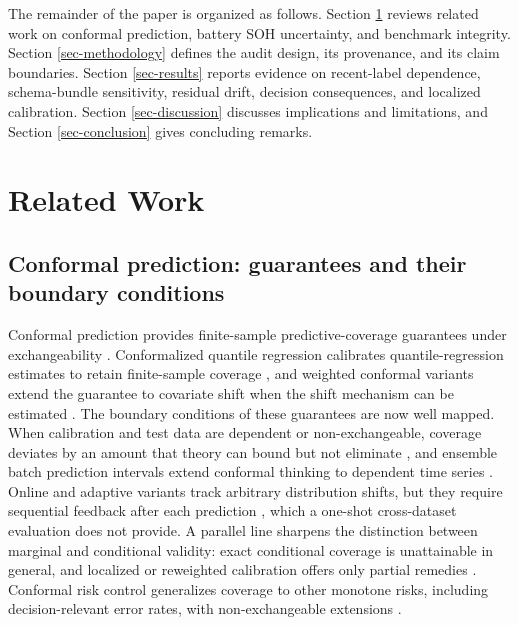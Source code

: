 \documentclass[
  number,
  preprint]{elsarticle}
\begin{document}
The remainder of the paper is organized as follows. Section
\ref{sec-related-work} reviews related work on conformal prediction,
battery SOH uncertainty, and benchmark integrity. Section
\ref{sec-methodology} defines the audit design, its provenance, and its
claim boundaries. Section \ref{sec-results} reports evidence on
recent-label dependence, schema-bundle sensitivity, residual drift,
decision consequences, and localized calibration. Section
\ref{sec-discussion} discusses implications and limitations, and Section
\ref{sec-conclusion} gives concluding remarks.

\section{Related Work}\label{sec-related-work}

\subsection{Conformal prediction: guarantees and their boundary
conditions}\label{conformal-prediction-guarantees-and-their-boundary-conditions}

Conformal prediction provides finite-sample predictive-coverage
guarantees under exchangeability
\citep{vovk2005algorithmic, lei2018distributionfree, angelopoulos2023conformal}.
Conformalized quantile regression calibrates quantile-regression
estimates to retain finite-sample coverage
\citep{romano2019conformalized}, and weighted conformal variants extend
the guarantee to covariate shift when the shift mechanism can be
estimated \citep{tibshirani2019covariate}. The boundary conditions of
these guarantees are now well mapped. When calibration and test data are
dependent or non-exchangeable, coverage deviates by an amount that
theory can bound but not eliminate
\citep{barber2023beyond, oliveira2024split}, and ensemble batch
prediction intervals extend conformal thinking to dependent time series
\citep{xu2023conformal}. Online and adaptive variants track arbitrary
distribution shifts, but they require sequential feedback after each
prediction \citep{gibbs2021adaptive, gibbs2024conformal}, which a
one-shot cross-dataset evaluation does not provide. A parallel line
sharpens the distinction between marginal and conditional validity:
exact conditional coverage is unattainable in general, and localized or
reweighted calibration offers only partial remedies
\citep{gibbs2025conformal, guan2022localized, hore2024conformal}.
Conformal risk control generalizes coverage to other monotone risks,
including decision-relevant error rates, with non-exchangeable
extensions
\citep{angelopoulos2024conformalrisk, farinhas2024nonexchangeable}.
\end{document}
